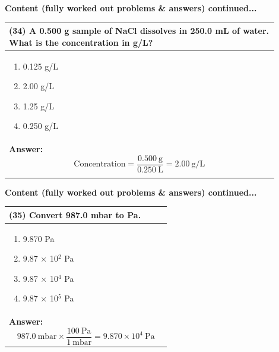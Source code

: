 \documentclass{article}
\begin{document}
{\newpage
\noindent
{\large\textbf{Content (fully worked out problems \& answers) continued...}}\\
\vspace{0.2cm}
\begin{tabular}{|p{0.9\linewidth}|}
\hline
\vspace{0.2cm}
\textbf{(34)} A 0.500 g sample of NaCl dissolves in 250.0 mL of water. What is the concentration in g/L?\\
\hline
\vspace{0.2cm}
\begin{minipage}[t]{0.85\linewidth}
\begin{enumerate}[label=\alph*.]
\item 0.125 g/L \
\item 2.00 g/L  \
\item 1.25 g/L \
\item 0.250 g/L
\end{enumerate}
\end{minipage} \\
\hline
\vspace{0.2cm}
\textbf{Answer:} 
\[
\text{Concentration} = \frac{0.500~\text{g}}{0.250~\text{L}} = 2.00~\text{g/L}
\] \\
\\
\hline
\end{tabular}

\newpage
\noindent
{\large\textbf{Content (fully worked out problems \& answers) continued...}}\\[0.2em]
\vspace{0.2cm}
\begin{tabular}{|p{0.9\linewidth}|}
\hline
\vspace{0.2cm}
\textbf{(35)} Convert 987.0 mbar to Pa.\\
\hline
\vspace{0.2cm}
\begin{minipage}[t]{0.85\linewidth}
\begin{enumerate}[label=\alph*.]
\item 9.870 Pa \
\item 9.87 $\times$ 10$^2$ Pa \
\item 9.87 $\times$ 10$^4$ Pa \
\item 9.87 $\times$ 10$^5$ Pa
\end{enumerate}
\end{minipage} \\
\hline
\vspace{0.2cm}
\textbf{Answer:} 
\[
987.0~\text{mbar} \times \frac{100~\text{Pa}}{1~\text{mbar}} = 9.870 \times 10^4~\text{Pa}
\] \\ 
\hline
\end{tabular}

}
\end{document}
